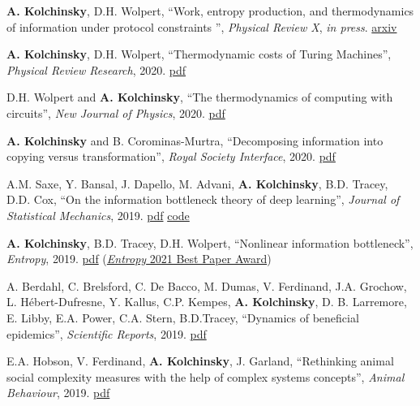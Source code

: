
\newcommand{\pdflink}[1]{\href{https://artemyk.github.io/assets/pdf/papers/#1.pdf}{pdf}}

\textbf{A. Kolchinsky}, D.H. Wolpert, ``Work, entropy production, and thermodynamics of information under protocol constraints
'', \emph{Physical Review X}, \emph{in press}. \href{http://arxiv.org/abs/2008.10764}{arxiv}

\textbf{A. Kolchinsky}, D.H. Wolpert, ``Thermodynamic costs of Turing Machines'', \emph{Physical Review Research}, 2020. %
\pdflink{Kolchinsky_Wolpert_2020_Thermodynamic costs of Turing machines}

D.H. Wolpert and \textbf{A. Kolchinsky}, ``The thermodynamics of computing with circuits'', \emph{New Journal of Physics}, 2020.  %
\pdflink{Wolpert and Kolchinsky - 2020 - Thermodynamics of computing with circuits}

\textbf{A. Kolchinsky} and B. Corominas-Murtra, ``Decomposing information into copying versus transformation'', 
\emph{Royal Society Interface}, 2020. %
\pdflink{Kolchinsky_Corominas-Murtra_2020_Decomposing information into copying versus transformation}

A.M. Saxe, Y. Bansal, J. Dapello, M. Advani, \textbf{A. Kolchinsky}, B.D. Tracey, D.D. Cox, 
``On the information bottleneck theory of deep learning'',  \emph{Journal of Statistical Mechanics}, 2019. 
\pdflink{Saxe et al_2019_On the information bottleneck theory of deep learning} 
\href{https://github.com/artemyk/ibsgd/tree/iclr2018}{code} %

\textbf{A. Kolchinsky}, B.D. Tracey, D.H. Wolpert, ``Nonlinear information bottleneck'', \emph{Entropy}, 2019.
\pdflink{Kolchinsky et al_2019_Nonlinear information bottleneck} (\href{https://www.mdpi.com/journal/entropy/awards/1209}{{\emph{Entropy} 2021 Best Paper Award}})

A. Berdahl, C. Brelsford, C. De Bacco, M. Dumas, V. Ferdinand, J.A. Grochow, L. Hébert-Dufresne,
Y. Kallus, C.P. Kempes, \textbf{A. Kolchinsky}, D. B. Larremore,
E. Libby, E.A. Power, C.A. Stern, B.D.Tracey, ``Dynamics of beneficial epidemics'', \emph{Scientific Reports}, 2019. 
\pdflink{Berdahl et al_2019_Dynamics of beneficial epidemics}

E.A. Hobson, V. Ferdinand, \textbf{A. Kolchinsky}, J. Garland, 
``Rethinking animal social complexity measures with the help of complex systems concepts'', 
\emph{Animal Behaviour}, 2019. 
\pdflink{Hobson et al_2019_Rethinking animal social complexity measures with the help of complex systems}

